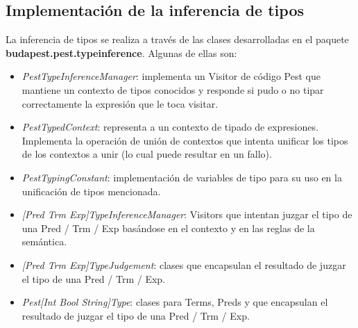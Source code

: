 \documentclass[a4paper]{article}
\begin{document}
\subsection{Implementación de la inferencia de tipos}

La inferencia de tipos se realiza a través de las clases desarrolladas en el paquete \textbf{budapest.pest.typeinference}. Algunas de ellas son:

\begin{itemize}
\item \emph{PestTypeInferenceManager}: implementa un Visitor de código Pest que mantiene un contexto de tipos conocidos y responde si pudo o no tipar correctamente la expresión que le toca visitar.
\item \emph{PestTypedContext}: representa a un contexto de tipado de expresiones.  Implementa la operación de unión de contextos que intenta unificar los tipos de los contextos a unir (lo cual puede resultar en un fallo).
\item \emph{PestTypingConstant}: implementación de variables de tipo para su uso en la unificación de tipos mencionada.
\item \emph{[Pred Trm Exp]TypeInferenceManager}: Visitors que intentan juzgar el tipo de una Pred / Trm / Exp basándose en el contexto y en las reglas de la semántica.
\item \emph{[Pred Trm Exp]TypeJudgement}: clases que encapsulan el resultado de juzgar el tipo de una Pred / Trm / Exp.
\item \emph{Pest[Int Bool String]Type}: clases para Terms, Preds y que encapsulan el resultado de juzgar el tipo de una Pred / Trm / Exp.
\end{itemize}
\end{document}

